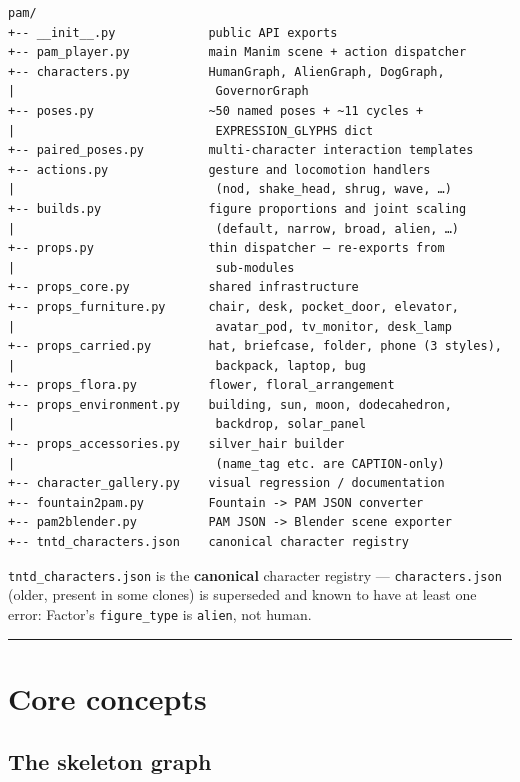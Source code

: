 \documentclass[
  11pt,
]{book}
\begin{document}
\begin{verbatim}
pam/
+-- __init__.py             public API exports
+-- pam_player.py           main Manim scene + action dispatcher
+-- characters.py           HumanGraph, AlienGraph, DogGraph,
|                            GovernorGraph
+-- poses.py                ~50 named poses + ~11 cycles +
|                            EXPRESSION_GLYPHS dict
+-- paired_poses.py         multi-character interaction templates
+-- actions.py              gesture and locomotion handlers
|                            (nod, shake_head, shrug, wave, …)
+-- builds.py               figure proportions and joint scaling
|                            (default, narrow, broad, alien, …)
+-- props.py                thin dispatcher — re-exports from
|                            sub-modules
+-- props_core.py           shared infrastructure
+-- props_furniture.py      chair, desk, pocket_door, elevator,
|                            avatar_pod, tv_monitor, desk_lamp
+-- props_carried.py        hat, briefcase, folder, phone (3 styles),
|                            backpack, laptop, bug
+-- props_flora.py          flower, floral_arrangement
+-- props_environment.py    building, sun, moon, dodecahedron,
|                            backdrop, solar_panel
+-- props_accessories.py    silver_hair builder
|                            (name_tag etc. are CAPTION-only)
+-- character_gallery.py    visual regression / documentation
+-- fountain2pam.py         Fountain -> PAM JSON converter
+-- pam2blender.py          PAM JSON -> Blender scene exporter
+-- tntd_characters.json    canonical character registry
\end{verbatim}

\texttt{tntd\_characters.json} is the \textbf{canonical} character
registry --- \texttt{characters.json} (older, present in some clones) is
superseded and known to have at least one error: Factor's
\texttt{figure\_type} is \texttt{alien}, not human.

\begin{center}\rule{0.5\linewidth}{0.5pt}\end{center}

\section{Core concepts}\label{core-concepts}

\subsection{The skeleton graph}\label{the-skeleton-graph}
\end{document}
